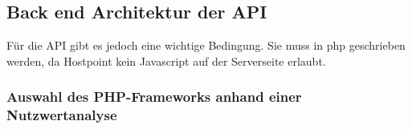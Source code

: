 \subsection{Back end Architektur der API}
Für die API gibt es jedoch eine wichtige Bedingung. Sie muss in php geschrieben werden, da Hostpoint kein Javascript auf der Serverseite erlaubt.



\subsubsection{Auswahl des PHP-Frameworks anhand einer Nutzwertanalyse}



